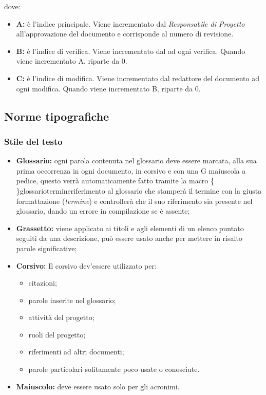 \documentclass[../NormediProgetto.tex]{subfiles}
\begin{document}
dove:

\begin{itemize}

\item{\textbf{A:}} è l'indice principale. Viene incrementato dal \textit{Responsabile di Progetto} all’approvazione del documento e 
corrisponde al numero di revisione.

\item{\textbf{B:}} è l'indice di verifica. Viene incrementato dal  ad ogni verifica. Quando viene incrementato A, riparte da 0.

\item{\textbf{C:}} è l'indice di modifica. Viene incrementato dal redattore del documento ad ogni modifica. Quando viene incrementato B, riparte da 0.

\end{itemize}

\subsection{Norme tipografiche}

\subsubsection{Stile del testo}

\begin{itemize}

\item{\textbf{Glossario:}} ogni parola contenuta nel glossario deve essere marcata, alla sua prima occorrenza in ogni documento, in corsivo e con una G maiuscola a pedice, questo verrà automaticamente fatto tramite la macro \{ \}glossario{termine}{riferimento al glossario} che stamperà il termine con la giusta formattazione (\textit{termine}) e controllerà che il suo riferimento sia presente nel glossario, dando un errore in compilazione se è assente;  

\item{\textbf{Grassetto:}} viene applicato ai titoli e agli elementi di un elenco puntato seguiti da una descrizione, può essere usato anche per mettere in risalto parole significative; 

\item{\textbf{Corsivo:}} Il corsivo dev’essere utilizzato per:
\begin{itemize}
\item citazioni;
\item parole inserite nel glossario;
\item attività del progetto;
\item ruoli del progetto;
\item riferimenti ad altri documenti;
\item parole particolari solitamente poco usate o conosciute.
\end{itemize}

\item{\textbf{Maiuscolo:}} deve essere usato solo per gli acronimi.

\end{itemize}
\end{document}
